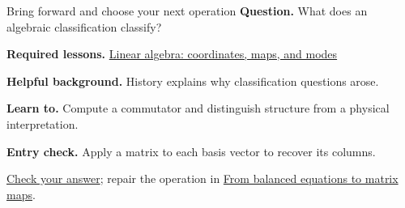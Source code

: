 \begin{learningcard}{Bring forward and choose your next operation}
\textsf{\textbf{Question.}} What does an algebraic classification classify?\par
\textbf{Required lessons.} \hyperref[learn:linear_algebra]{Linear algebra: coordinates, maps, and modes}\par
\textbf{Helpful background.} History explains why classification questions arose.\par
\textbf{Learn to.} Compute a commutator and distinguish structure from a physical interpretation.\par
\textbf{Entry check.} Apply a matrix to each basis vector to recover its columns.\par
\hyperref[solution:entry:algebra]{Check your answer}; repair the operation in \hyperref[learn:matrix_maps]{From balanced equations to matrix maps}.
\end{learningcard}
